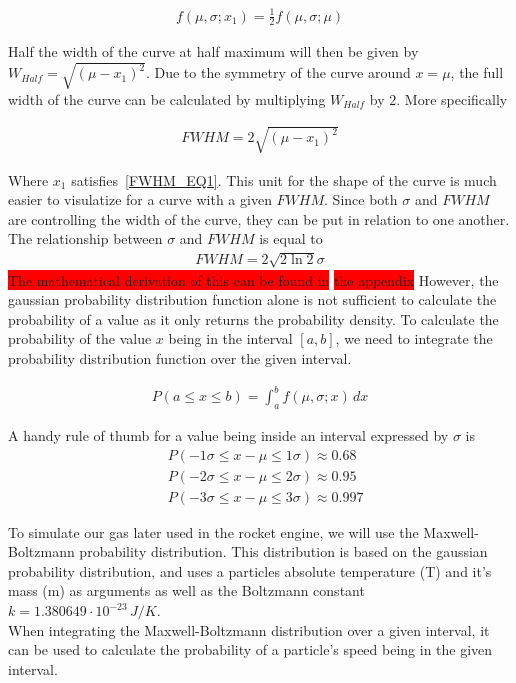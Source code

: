 \documentclass[reprint,english,notitlepage]{revtex4-2}
\begin{document}
\begin{align}
    f(\mu, \sigma; x_1) = \frac{1}{2} f(\mu, \sigma; \mu) \label{FWHM_EQ1}
\end{align}

Half the width of the curve at half maximum will then be given by $W_{Half} = \sqrt{(\mu - x_1)^2}$.
Due to the symmetry of the curve around $x =\mu$, the full width of the curve can be calculated by multiplying $W_{Half}$ by $2$.
More specifically

\begin{align*}
    FWHM = 2\sqrt{(\mu - x_1)^2}
\end{align*}

Where $x_1$ satisfies~\ref{FWHM_EQ1}. This unit for the shape of the curve is much easier to visulatize for a curve with a given $FWHM$.
Since both $\sigma$ and $FWHM$ are controlling the width of the curve, they can be put in relation to one another.
The relationship between $\sigma$ and $FWHM$ is equal to
\begin{align*}
    FWHM = 2\sqrt{2\ln2}\sigma
\end{align*}
\colorbox{red}{The mathematical derivation of this can be found in}
\colorbox{red}{the appendix}
However, the gaussian probability distribution function alone is not sufficient to calculate the probability of a value as it only returns the probability density.
To calculate the probability of the value $x$ being in the interval $[a, b]$, we need to integrate the probability distribution function over the given interval.

\begin{align*}
    P(a ≤ x ≤ b) = \int_{a}^{b} f(\mu, \sigma; x) \, dx
\end{align*}

A handy rule of thumb for a value being inside an interval expressed by $\sigma$ is
\begin{align*}
    &P(-1\sigma ≤ x-\mu ≤ 1\sigma) ≈ 0.68\\
	&P(-2\sigma ≤ x-\mu ≤ 2\sigma) ≈ 0.95\\
	&P(-3\sigma ≤ x-\mu ≤ 3\sigma) ≈ 0.997
\end{align*}

To simulate our gas later used in the rocket engine, we will use the Maxwell-Boltzmann probability distribution.
This distribution is based on the gaussian probability distribution, and uses a particles absolute temperature (T) and it's mass (m) as arguments as well as the Boltzmann constant
$k = 1.380649 \cdot 10^{-23}\,J/K$.
\\When integrating the Maxwell-Boltzmann distribution over a given interval, it can be used to calculate the probability of a particle's speed being in the given interval.
\end{document}
